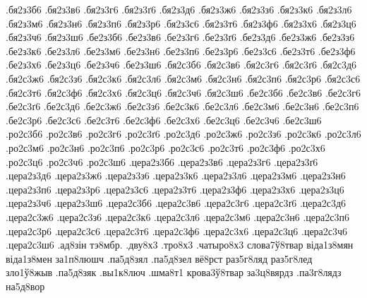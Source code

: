 {.бя2з3б6
.бя2з3в6
.бя2з3г6
.бя2з3ґ6
.бя2з3д6
.бя2з3ж6
.бя2з3з6
.бя2з3к6
.бя2з3л6
.бя2з3м6
.бя2з3н6
.бя2з3п6
.бя2з3р6
.бя2з3с6
.бя2з3т6
.бя2з3ф6
.бя2з3х6
.бя2з3ц6
.бя2з3ч6
.бя2з3ш6
.бе2з3б6
.бе2з3в6
.бе2з3г6
.бе2з3ґ6
.бе2з3д6
.бе2з3ж6
.бе2з3з6
.бе2з3к6
.бе2з3л6
.бе2з3м6
.бе2з3н6
.бе2з3п6
.бе2з3р6
.бе2з3с6
.бе2з3т6
.бе2з3ф6
.бе2з3х6
.бе2з3ц6
.бе2з3ч6
.бе2з3ш6
.бя2с3б6
.бя2с3в6
.бя2с3г6
.бя2с3ґ6
.бя2с3д6
.бя2с3ж6
.бя2с3з6
.бя2с3к6
.бя2с3л6
.бя2с3м6
.бя2с3н6
.бя2с3п6
.бя2с3р6
.бя2с3с6
.бя2с3т6
.бя2с3ф6
.бя2с3х6
.бя2с3ц6
.бя2с3ч6
.бя2с3ш6
.бе2с3б6
.бе2с3в6
.бе2с3г6
.бе2с3ґ6
.бе2с3д6
.бе2с3ж6
.бе2с3з6
.бе2с3к6
.бе2с3л6
.бе2с3м6
.бе2с3н6
.бе2с3п6
.бе2с3р6
.бе2с3с6
.бе2с3т6
.бе2с3ф6
.бе2с3х6
.бе2с3ц6
.бе2с3ч6
.бе2с3ш6
.ро2с3б6
.ро2с3в6
.ро2с3г6
.ро2с3ґ6
.ро2с3д6
.ро2с3ж6
.ро2с3з6
.ро2с3к6
.ро2с3л6
.ро2с3м6
.ро2с3н6
.ро2с3п6
.ро2с3р6
.ро2с3с6
.ро2с3т6
.ро2с3ф6
.ро2с3х6
.ро2с3ц6
.ро2с3ч6
.ро2с3ш6
.цера2з3б6
.цера2з3в6
.цера2з3г6
.цера2з3ґ6
.цера2з3д6
.цера2з3ж6
.цера2з3з6
.цера2з3к6
.цера2з3л6
.цера2з3м6
.цера2з3н6
.цера2з3п6
.цера2з3р6
.цера2з3с6
.цера2з3т6
.цера2з3ф6
.цера2з3х6
.цера2з3ц6
.цера2з3ч6
.цера2з3ш6
.цера2с3б6
.цера2с3в6
.цера2с3г6
.цера2с3ґ6
.цера2с3д6
.цера2с3ж6
.цера2с3з6
.цера2с3к6
.цера2с3л6
.цера2с3м6
.цера2с3н6
.цера2с3п6
.цера2с3р6
.цера2с3с6
.цера2с3т6
.цера2с3ф6
.цера2с3х6
.цера2с3ц6
.цера2с3ч6
.цера2с3ш6
.ад8зін
тэ8мбр.
.дву8х3
.тро8х3
.чатыро8х3
слова7ў8твар
віда1з8мян
віда1з8мен
за1п8люшч
.па5д8зял
.па5д8зел
вё8рст
раз5г8ляд
раз5г8лед
зло1ў8жыв
.па5д8зяк
.вы1к8люч
.шма8т1
крова3ў8твар
за3ц8вярдз
.па3г8лядз
на5д8вор
}

